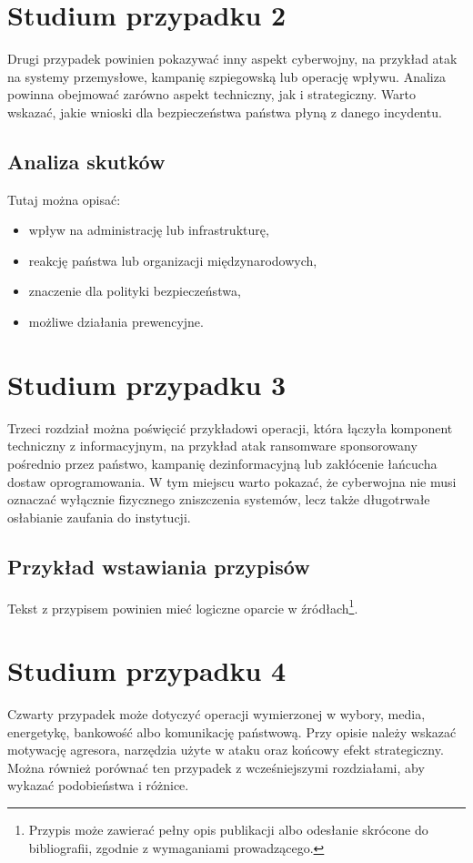 \documentclass[12pt,a4paper]{article}
\begin{document}
\section{Studium przypadku 2}
Drugi przypadek powinien pokazywać inny aspekt cyberwojny, na przykład atak na systemy przemysłowe, kampanię szpiegowską lub operację wpływu. Analiza powinna obejmować zarówno aspekt techniczny, jak i strategiczny. Warto wskazać, jakie wnioski dla bezpieczeństwa państwa płyną z danego incydentu.

\subsection{Analiza skutków}
Tutaj można opisać:
\begin{itemize}[leftmargin=1.5cm]
    \item wpływ na administrację lub infrastrukturę,
    \item reakcję państwa lub organizacji międzynarodowych,
    \item znaczenie dla polityki bezpieczeństwa,
    \item możliwe działania prewencyjne.
\end{itemize}

\section{Studium przypadku 3}
Trzeci rozdział można poświęcić przykładowi operacji, która łączyła komponent techniczny z informacyjnym, na przykład atak ransomware sponsorowany pośrednio przez państwo, kampanię dezinformacyjną lub zakłócenie łańcucha dostaw oprogramowania. W tym miejscu warto pokazać, że cyberwojna nie musi oznaczać wyłącznie fizycznego zniszczenia systemów, lecz także długotrwałe osłabianie zaufania do instytucji.

\subsection{Przykład wstawiania przypisów}
Tekst \cite{bib:delaherche2012} z przypisem powinien mieć logiczne oparcie w źródłach\footnote{Przypis może zawierać pełny opis publikacji albo odesłanie skrócone do bibliografii, zgodnie z wymaganiami prowadzącego.}.

\section{Studium przypadku 4}
Czwarty przypadek może dotyczyć operacji wymierzonej w wybory, media, energetykę, bankowość albo komunikację państwową. Przy opisie należy wskazać motywację agresora, narzędzia użyte w ataku oraz końcowy efekt strategiczny. Można również porównać ten przypadek z wcześniejszymi rozdziałami, aby wykazać podobieństwa i różnice.
\end{document}
